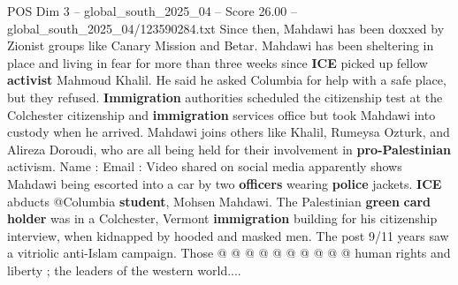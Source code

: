 \begin{textsample}{POS Dim 3 – global\_south\_2025\_04 – Score 26.00 – global\_south\_2025\_04/123590284.txt}
Since then, Mahdawi has been doxxed by Zionist groups like Canary Mission and Betar.
Mahdawi has been sheltering in place and living in fear for more than three weeks since \textbf{ICE} picked up fellow \textbf{activist} Mahmoud Khalil.
He said he asked Columbia for help with a safe place, but they refused. \textbf{Immigration} authorities scheduled the citizenship test at the Colchester citizenship and \textbf{immigration} services office but took Mahdawi into custody when he arrived.
Mahdawi joins others like Khalil, Rumeysa Ozturk, and Alireza Doroudi, who are all being held for their involvement in \textbf{pro-Palestinian} activism.
Name : Email : Video shared on social media apparently shows Mahdawi being escorted into a car by two \textbf{officers} wearing \textbf{police} jackets. \textbf{ICE} abducts @Columbia \textbf{student}, Mohsen Mahdawi.
The Palestinian \textbf{green} \textbf{card} \textbf{holder} was in a Colchester, Vermont \textbf{immigration} building for his citizenship interview, when kidnapped by hooded and masked men.
The post 9/11 years saw a vitriolic anti-Islam campaign.
Those @ @ @ @ @ @ @ @ @ @ human rights and liberty ; the leaders of the western world....

\end{textsample}
